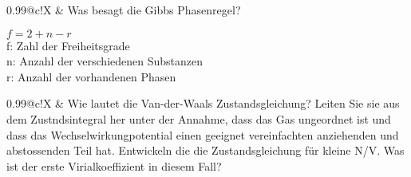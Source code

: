 \documentclass[a4paper,12pt]{scrartcl}
\makeatletter
\newcounter{qc}\setcounter{qc}{1}
\newenvironment{fshaded}{
\def\FrameCommand{\fcolorbox{framecolor}{shadecolor}}
\MakeFramed {\FrameRestore}}
{\endMakeFramed}
\def\frage#1{
\begin{fshaded}
\noindent
\begin{tabularx}{0.99\textwidth}{@{}c!{\color{framecolor}\vline}X}
{ \bf \rm \theqc }	&	\noindent #1
\end{tabularx}
\stepcounter{qc}
\end{fshaded}
}
\makeatother
\begin{document}
	
\frage{Was besagt die Gibbs Phasenregel?}
\noindent
	$f=2+n-r$\\
	f: Zahl der Freiheitsgrade\\
	n: Anzahl der verschiedenen Substanzen\\
	r: Anzahl der vorhandenen Phasen\\	
	
\frage{Wie lautet die Van-der-Waals Zustandsgleichung? Leiten Sie sie aus dem Zustndsintegral her unter der Annahme, dass das Gas ungeordnet ist und dass das Wechselwirkungpotential einen geeignet vereinfachten
anziehenden und abstossenden Teil hat. Entwickeln die die Zustandsgleichung für kleine N/V. Was ist der erste 
Virialkoeffizient in diesem Fall?}
\end{document}
